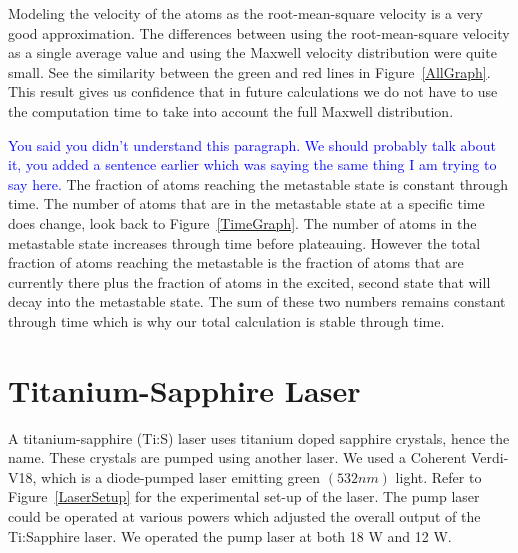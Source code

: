\documentclass[prb,preprint]{revtex4-1}
\begin{document}
Modeling the velocity of the atoms as the root-mean-square velocity is a very good approximation. The differences between using the root-mean-square velocity as a single average value and using the Maxwell velocity distribution were quite small. See the similarity between the green and red lines in Figure~\ref{AllGraph}.  This result gives us confidence that in future calculations we do not have to use the computation time to take into account the full Maxwell distribution.

\textcolor{blue}{You said you didn't understand this paragraph. We should probably talk about it, you added a sentence earlier which was saying the same thing I am trying to say here.}
The fraction of atoms reaching the metastable state is constant through time. The number of atoms that are in the metastable state at a specific time does change, look back to Figure~\ref{TimeGraph}. The number of atoms in the metastable state increases through time before plateauing. However the total fraction of atoms reaching the metastable is the fraction of atoms that are currently there plus the fraction of atoms in the excited, second state that will decay into the metastable state. The sum of these two numbers remains constant through time which is why our total calculation is stable through time.
  

\section{Titanium-Sapphire Laser}

A titanium-sapphire (Ti:S) laser uses titanium doped sapphire crystals, hence the name. These crystals are pumped using another laser. We used a Coherent Verdi-V18, which is a diode-pumped laser emitting green $(532nm)$ light. Refer to Figure~\ref{LaserSetup} for the experimental set-up of the laser. The pump laser could be operated at various powers which adjusted the overall output of the Ti:Sapphire laser. We operated the pump laser at both 18 W and 12 W.
\end{document}
